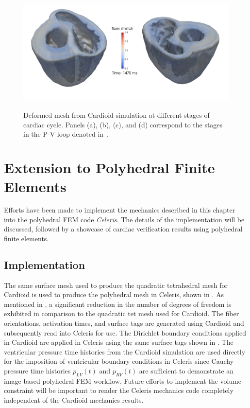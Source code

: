 \begin{figure}
{		\includegraphics[scale=0.08]{media/4-cardioid/6-vid/d.png}
\label{fig:snaps4}}		
%
\caption{Deformed mesh from Cardioid simulation at different stages of cardiac cycle. Panels (a), (b), (c), and (d) correspond to the stages in the P-V loop denoted in~.}
\label{fig:snaps}
\end{figure}

\section{Extension to Polyhedral Finite Elements}
\label{Polyhedral Finite Elements}

Efforts have been made to implement the mechanics described in this chapter into the polyhedral FEM code \textit{Celeris}. The details of the implementation will be discussed, followed by a showcase of cardiac verification results using polyhedral finite elements.

\subsection{Implementation}

The same surface mesh used to produce the quadratic tetrahedral mesh for Cardioid is used to produce the polyhedral mesh in Celeris, shown in . As mentioned in , a significant reduction in the number of degrees of freedom is exhibited in comparison to the quadratic tet mesh used for Cardioid. The fiber orientations, activation times, and surface tags are generated using Cardioid and subsequently read into Celeris for use. The Dirichlet boundary conditions applied in Cardioid are applied in Celeris using the same surface tags shown in . The ventricular pressure time histories from the Cardioid simulation are used directly for the imposition of ventricular boundary conditions in Celeris since Cauchy pressure time histories $p_{LV}(t)$ and $p_{RV}(t)$ are sufficient to demonstrate an image-based polyhedral FEM workflow. Future efforts to implement the volume constraint will be important to render the Celeris mechanics code completely independent of the Cardioid mechanics results. 

